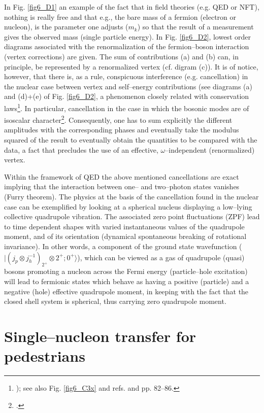 In Fig. \ref{fig6_D1} an example of the fact that in field theories (e.g. QED or NFT), nothing is really free and that e.g., the bare mass of a fermion (electron or nucleon), is the parameter one adjusts ($m_k$) so that the result of a measurement  gives the observed mass (single particle energy). In Fig. \ref{fig6_D2}, lowest order diagrams associated with the renormalization of the fermion--boson interaction (vertex corrections) are given. The sum of contributions (a) and (b) can, in principle, be represented by a renormalized vertex (cf. digram (c)). It is of notice, however, that there is, as a rule, conspicuous interference (e.g. cancellation) in the nuclear case between vertex and self--energy contributions (see diagrams (a) and (d)+(e) of Fig. \ref{fig6_D2}, a phenomenon closely related with conservation laws\footnote{ \cite{Schrieffer:64}); see also Fig. \ref{fig6_C3x} and refs. \cite{Bortignon:81,Bertsch:83} and \cite{Bortignon:98} pp. 82--86.}. In particular, cancellation in the case in which the bosonic modes are of isoscalar character\footnote{\cite{Bortignon:83}.}. Consequently, one has to sum explicitly the different amplitudes with the corresponding phases and eventually take the modulus squared of the result to eventually obtain the quantities to be compared with the data, a fact that precludes the use of an effective, $\omega$--independent (renormalized) vertex.

Within the framework of QED the above mentioned cancellations are exact implying that the interaction between one-- and two--photon states vanishes (Furry theorem). The physics at the basis of the cancellation found in the nuclear case can be exemplified by looking at a spherical nucleus displaying a low--lying collective quadrupole vibration. The associated zero point fluctuations (ZPF) lead to time dependent shapes with varied instantaneous values of the quadrupole moment,  and of its orientation (dynamical spontaneous breaking of rotational invariance). In other words, a component of the ground state wavefunction ($|(j_p \otimes j_h^{-1})_{2^+} \otimes 2^+; 0^+\rangle $), which can be viewed as a  gas of quadrupole (quasi) bosons promoting a nucleon across the Fermi energy (particle--hole excitation) will lead to fermionic states which behave as having a positive (particle) and a negative (hole) effective quadrupole moment, in keeping with the fact that the closed shell system is spherical, thus carrying zero quadrupole moment. 

\section{Single--nucleon transfer for pedestrians}\label{C6AppE}

